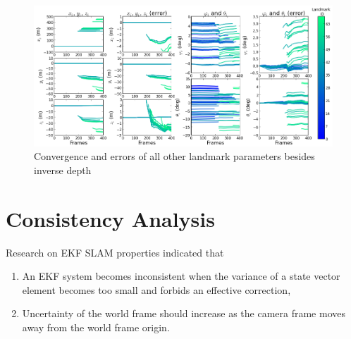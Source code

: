 \begin{figure}[h]
\centering
\includegraphics[width=15cm, keepaspectratio=true]
{./Figures/fltfig/cut1/Figure20.png}
\caption{Convergence and errors of all other landmark parameters
  besides inverse depth}
\label{fltfig:2}
\end{figure}
\FloatBarrier

\section{Consistency Analysis}\label{sec:flight-consistency}
Research on EKF SLAM properties indicated that 
\begin{enumerate}
  \item An EKF system becomes inconsistent when the variance of a state
  vector element becomes too small and forbids an effective correction,
  \item Uncertainty of the world frame should increase as the
  camera frame moves away from the world frame origin.
\end{enumerate}

